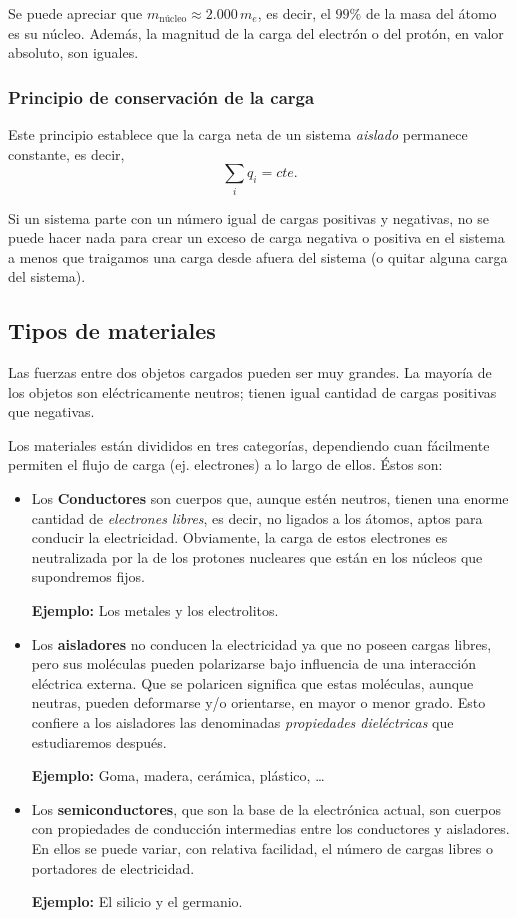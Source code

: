Se puede apreciar que $m_{\text{núcleo}} \approx 2.000 \, m_e$, es decir, el $99 \%$ de la masa del átomo es su núcleo. Además, la magnitud de la carga del electrón o del protón, en valor absoluto, son iguales.

\subsubsection{Principio de conservación de la carga}

Este principio establece que la carga neta de un sistema \textit{aislado} permanece constante, es decir,
\begin{equation*}
\sum_i q_i = cte.
\end{equation*}

Si un sistema parte con un número igual de cargas positivas y negativas, no se puede hacer nada para crear un exceso de carga negativa o positiva en el sistema a menos que traigamos una carga desde afuera del sistema (o quitar alguna carga del sistema).

\subsection{Tipos de materiales}

Las fuerzas entre dos objetos cargados pueden ser muy grandes. La mayoría de los objetos son eléctricamente neutros; tienen igual cantidad de cargas positivas que negativas.

Los materiales están divididos en tres categorías, dependiendo cuan fácilmente permiten el flujo de carga (ej. electrones) a lo largo de ellos. Éstos son:

\begin{itemize}
\item Los \textbf{Conductores} son cuerpos que, aunque estén neutros, tienen una enorme cantidad de \textit{electrones libres}, es decir, no ligados a los átomos, aptos para conducir la electricidad. Obviamente, la carga de estos electrones es neutralizada por la de los protones nucleares que están en los núcleos que supondremos fijos.

\textbf{Ejemplo:} Los metales y los electrolitos.

\item Los \textbf{aisladores} no conducen la electricidad ya que no poseen cargas libres, pero sus moléculas pueden polarizarse bajo influencia de una interacción eléctrica externa. Que se polaricen significa que estas moléculas, aunque neutras, pueden deformarse y/o orientarse, en mayor o menor grado. Esto confiere a los aisladores las denominadas \textit{propiedades dieléctricas} que estudiaremos después.

\textbf{Ejemplo:} Goma, madera, cerámica, plástico, \dots

\item Los \textbf{semiconductores}, que son la base de la electrónica actual, son cuerpos con propiedades de conducción intermedias entre los conductores y aisladores. En ellos se puede variar, con relativa facilidad, el número de cargas libres o portadores de electricidad.

\textbf{Ejemplo:} El silicio y el germanio.
\end{itemize}

